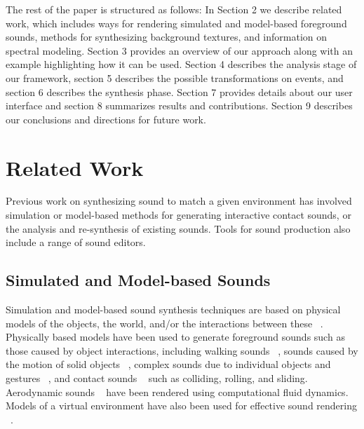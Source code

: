 \documentclass[review]{acmsiggraph}      %
\begin{document}

The rest of the paper is structured as follows: In Section 2 we describe 
related work, which includes ways for rendering simulated and 
model-based foreground sounds, methods for synthesizing background textures, 
and information on spectral modeling. Section 3 provides an overview of our 
approach along with an example highlighting how it can be used. Section 4 
describes the analysis stage of our framework, section 5 describes the possible 
transformations on events, and section 6 describes the synthesis phase. 
Section 7 provides details about our user interface and section 8 summarizes results 
and contributions. Section 9 describes our conclusions and directions for future work. 


\section{Related Work}

Previous work on synthesizing sound to match a given environment has 
involved simulation or model-based methods for generating interactive 
contact sounds, or the analysis and re-synthesis of existing sounds. 
Tools for sound production also include a range of sound editors. 

\subsection{Simulated and Model-based Sounds}

Simulation and model-based sound synthesis techniques are based on physical models of the 
objects, the world, and/or the interactions between these ~\cite{CookBook}. 
Physically based models have been used to generate foreground sounds such as those caused by object interactions, including walking sounds ~\cite{Cook02}, sounds caused by the motion of 
solid objects ~\cite{OBrien01}, complex sounds due to individual objects and gestures 
~\cite{Rocchesso03}, and contact sounds ~\cite{Doel01} such as colliding, rolling, and 
sliding. Aerodynamic sounds ~\cite{Dobashi03} have been rendered using computational fluid 
dynamics. Models of a virtual environment have also been used for effective sound 
rendering ~\cite{Takala92,Tsingos04}.

\end{document}

